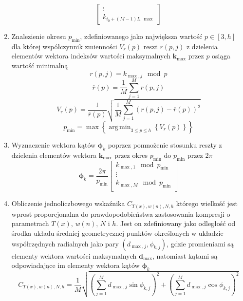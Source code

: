 \documentclass[pl,12pt]{aghdpl}
\DeclareMathOperator*{\argmin}{arg\,min}
\begin{document}
\begin{enumerate}
\begin{equation}
\begin{bmatrix}
          \vdots\\
          k_{i_0+(M-1)L,\max}
        \end{bmatrix}
      \end{equation}
    \item Znalezienie okresu $p_{\min}$, zdefiniowanego jako największa wartość
      $p \in [3, h]$ dla której współczynnik zmienności $V_{r}(p)$ reszt $r(p,
      j)$ z dzielenia elementów wektora indeksów wartości maksymalnych $\bm
      k_{\max}$ przez $p$ osiąga wartość minimalną
      \begin{equation}
        r(p, j) = k_{\max, j}\mod p
      \end{equation}
      \begin{equation}
        \overline r(p) = \frac{1}{M}\sum_{j=1}^{M}r(p, j)
      \end{equation}
      \begin{equation}
        V_{r}(p) = \frac{1}{\overline r(p)}\sqrt{\frac{1}{M}
        \sum_{j=1}^{M}\left(r(p, j) - \overline r(p)\right)^2}
      \end{equation}
      \begin{equation}
        p_{\min} = \max\left\{\argmin_{3 \leq p \leq h}
        \left\{V_{r}(p)\right\}\right\}
      \end{equation}
    \item Wyznaczenie wektora kątów $\bm\phi_k$ poprzez pomnożenie stosunku
      reszty z dzielenia elementów wektora $\bm k_{\max}$ przez
      okres $p_{\min}$ do $p_{\min}$ przez $2\pi$
      \begin{equation}
        \bm\phi_k = \frac{2\pi}{p_{\min}}\begin{bmatrix}
          k_{\max,1}\mod p_{\min}\\
          \vdots\\
          k_{\max,M}\mod p_{\min}\\
        \end{bmatrix}
      \end{equation}
    \item Obliczenie jednoliczbowego wskaźnika $C_{T(x),w(n),N,h}$ którego
      wielkość jest wprost proporcjonalna do prawdopodobieństwa zastosowania
      kompresji o parametrach $T(x)$, $w(n)$, $N$ i $h$. Jest
      on zdefiniowany jako odległość od środka układu średniej geometrycznej
      punktów określonych w układzie współrzędnych radialnych jako pary
      $(d_{\max, j}, \phi_{k, j})$, gdzie promieniami są elementy wektora
      wartości maksymalnych $\bm d_{\max}$, natomiast kątami są odpowiadające im
      elementy wektora kątów $\bm\phi_k$
      \begin{equation}
        C_{T(x),w(n),N,h} =\frac{1}{M}\sqrt{\left(\sum_{j=1}^{M}d_{\max,j}\sin
        \phi_{k,j}\right)^2+\left(\sum_{j=1}^{M}d_{\max,j}\cos
        \phi_{k,j}\right)^2}
      \end{equation}
\end{enumerate}
\end{document}
